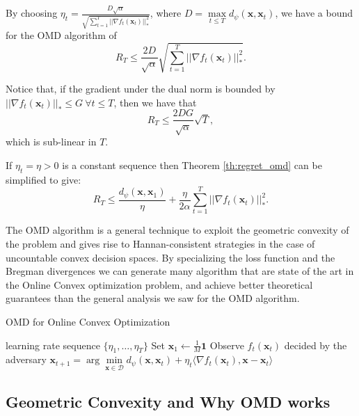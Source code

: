 By choosing $\eta_t=\frac{D\sqrt{\alpha}}{\sqrt{\sum\limits_{t=1}^T||\nabla f_t(\mathbf x_t)||_*^2}}$, where $D=\max\limits_{t\le T}d_\psi(\mathbf x,\mathbf x_t)$, we have a bound for the OMD algorithm of 
\begin{equation}
R_T\le\frac{2D}{\sqrt\alpha}\sqrt{\sum\limits_{t=1}^T||\nabla f_t(\mathbf x_t)||_*^2}.
\end{equation}

Notice that, if the gradient under the dual norm is bounded by $||\nabla f_t(\mathbf x_t)||_*\le G\ \forall t\le T$, then we have that 
\begin{equation}
R_T\le\frac{2DG}{\sqrt\alpha}\sqrt T,
\end{equation}
which is sub-linear in $T$.

If $\eta_t=\eta>0$ is a constant sequence then Theorem \ref{th:regret_omd} can be simplified to give: 
\begin{equation}
R_T\le \frac{d_\psi(\mathbf x,\mathbf x_1)}{\eta}+\frac{\eta}{2\alpha}\sum\limits_{t=1}^T||\nabla f_t(\mathbf x_t)||^2_*.
\end{equation}

The OMD algorithm is a general technique to exploit the geometric convexity of the problem and gives rise to Hannan-consistent strategies in the case of uncountable convex decision spaces. By specializing the loss function and the Bregman divergences we can generate many algorithm that are state of the art in the Online Convex optimization problem, and achieve better theoretical guarantees than the general analysis we saw for the OMD algorithm.

\begin{algorithm}[t!]
    \caption{OMD for Online Convex Optimization} 
    \label{alg:OMD_in_OCO}
    \begin{algorithmic}[1]
    \REQUIRE learning rate sequence $\{\eta_1, \ldots, \eta_T\}$  \nonumber
    \STATE Set $\mathbf{\mathbf x}_1 \gets \frac{1}{M} \mathbf{1}$ \label{line:init}
    \STATE Observe $f_t(\mathbf x_t)$ decided by the adversary \label{line:out}
    \STATE $\mathbf x_{t+1} =\arg\min\limits_{\mathbf x\in\mathcal D} d_\psi(\mathbf x,\mathbf x_t)+\eta_t\langle\nabla f_t(\mathbf x_t),\mathbf x-\mathbf x_t\rangle$\label{line:update}
    \ENDFOR
    \end{algorithmic}
\end{algorithm}

\subsection{Geometric Convexity and Why OMD works} 

